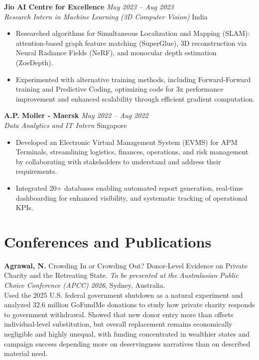 \documentclass[10pt,a4paper]{article}
\newcommand{\cventry}[4]{%
\textbf{#1} \hfill \textit{#2} \\
\textit{#3} \hfill #4
\vspace{2pt}
}
\begin{document}
\vspace{4pt}

\cventry{Jio AI Centre for Excellence}{May 2023 -- Aug 2023}{Research Intern in Machine Learning (3D Computer Vision)}{India}
\begin{itemize}
    \item Researched algorithms for Simultaneous Localization and Mapping (SLAM): attention-based graph feature matching (SuperGlue), 3D reconstruction via Neural Radiance Fields (NeRF), and monocular depth estimation (ZoeDepth).
    \item Experimented with alternative training methods, including Forward-Forward training and Predictive Coding, optimizing code for 3x performance improvement and enhanced scalability through efficient gradient computation.
\end{itemize}

\vspace{4pt}

\cventry{A.P. Moller - Maersk}{May 2022 -- Aug 2022}{Data Analytics and IT Intern}{Singapore}
\begin{itemize}
    \item Developed an Electronic Virtual Management System (EVMS) for APM Terminals, streamlining logistics, finances, operations, and risk management by collaborating with stakeholders to understand and address their requirements.
    \item Integrated 20+ databases enabling automated report generation, real-time dashboarding for enhanced visibility, and systematic tracking of operational KPIs.
\end{itemize}

\section{Conferences and Publications}

\textbf{Agrawal, N.} Crowding In or Crowding Out? Donor-Level Evidence on Private Charity and the Retreating State. \textit{To be presented at the Australasian Public Choice Conference (APCC) 2026}, Sydney, Australia.\\
{\small Used the 2025 U.S. federal government shutdown as a natural experiment and analyzed 32.6 million GoFundMe donations to study how private charity responds to government withdrawal. Showed that new donor entry more than offsets individual-level substitution, but overall replacement remains economically negligible and highly unequal, with funding concentrated in wealthier states and campaign success depending more on deservingness narratives than on described material need.}
\end{document}
